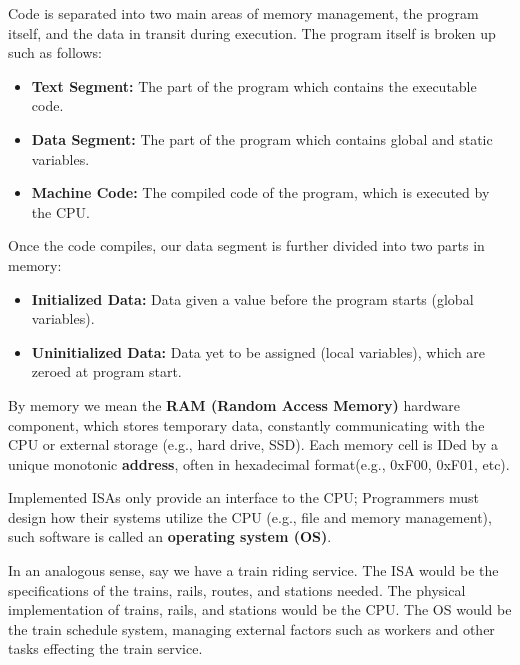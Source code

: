 \begin{Def}

    \label{def:machine_code}

    Code is separated into two main areas of memory management, the program itself, and the data in transit during execution.
    The program itself is broken up such as follows:
    \begin{itemize}
        \item \textbf{Text Segment:} The part of the program which contains the executable code.
        \item \textbf{Data Segment:} The part of the program which contains global and static variables.
        \item \textbf{Machine Code:} The compiled code of the program, which is executed by the CPU.
    \end{itemize}

    \noindent
    Once the code compiles, our data segment is further divided into two parts in memory:
    \begin{itemize}
        \item \textbf{Initialized Data:}  Data given a value before the program starts (global variables).
        \item \textbf{Uninitialized Data:} Data yet to be assigned (local variables), which are zeroed at program start.
    \end{itemize}
    \noindent
    By memory we mean the \textbf{RAM (Random Access Memory)} hardware component, which stores temporary data, constantly 
    communicating with the CPU or external storage (e.g., hard drive, SSD). Each memory cell is IDed by a unique monotonic \textbf{address},
    often in hexadecimal format(e.g., 0xF00, 0xF01, etc).
\end{Def}

\newpage 

\begin{Def}

    \label{def:operating_system}

    Implemented ISAs only provide an interface to the CPU; Programmers must
    design how their systems utilize the CPU (e.g., file and memory management), such software is called an \textbf{operating system (OS)}.
\end{Def}

\vspace{-1em}
\begin{Tip} In an analogous sense, say we have a train riding service. The ISA would be the specifications of the trains, rails, routes, and stations needed.
    The physical implementation of trains, rails, and stations would be the CPU. The OS would be the train schedule system, managing external 
    factors such as workers and other tasks effecting the train service.
\end{Tip}

